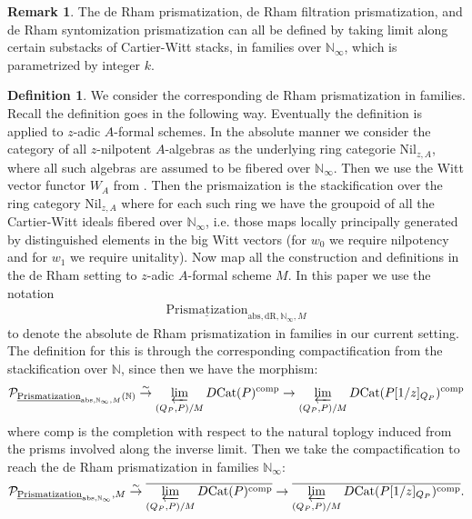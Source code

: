 \documentclass[12pt]{article}
\theoremstyle{definition}
\newtheorem{remark}{Remark}
\newtheorem{definition}{Definition}
\begin{document}
\begin{remark}
The de Rham prismatization, de Rham filtration prismatization, and de Rham syntomization prismatization can all be defined by taking limit along certain substacks of Cartier-Witt stacks, in families over $\mathbb{N}_\infty$, which is parametrized by integer $k$. 
\end{remark}

\begin{definition}
We consider the corresponding de Rham prismatization in families. Recall the definition goes in the following way. Eventually the definition is applied to $z$-adic $A$-formal schemes. In the absolute manner we consider the category of all $z$-nilpotent $A$-algebras as the underlying ring categorie $\mathrm{Nil}_{z,A}$, where all such algebras are assumed to be fibered over $\mathbb{N}_\infty$. Then we use the Witt vector functor $W_A$ from \cite{3LH}. Then the prismaization is the stackification over the ring category $\mathrm{Nil}_{z,A}$ where for each such ring we have the groupoid of all the Cartier-Witt ideals fibered over $\mathbb{N}_\infty$, i.e. those maps locally principally generated by distinguished elements in the big Witt vectors (for $w_0$ we require nilpotency and for $w_1$ we require unitality). Now map all the construction and definitions in the de Rham setting to $z$-adic $A$-formal scheme $M$. In this paper we use the notation 
\begin{align}
\underline{\mathrm{Prismatization}}_{\mathrm{abs},\mathrm{dR},\mathbb{N}_\infty,M}
\end{align}
to denote the absolute de Rham prismatization in families in our current setting. The definition for this is through the corresponding compactification from the stackification over $\mathbb{N}$, since then we have the morphism:
\begin{align}
\mathcal{P}_{\underline{\mathrm{Prismatization}}_{\mathrm{abs},\mathbb{N}_\infty,M}(\mathbb{N})} \overset{\sim}{\rightarrow} \varprojlim_{(Q_P,P)/M} D\mathrm{Cat}(P)^\mathrm{comp}\rightarrow \varprojlim_{(Q_P,P)/M} D\mathrm{Cat}(P[1/z]_{Q_P})^\mathrm{comp}
\end{align}
where $\mathrm{comp}$ is the completion with respect to the natural toplogy induced from the prisms involved along the inverse limit. Then we take the compactification to reach the de Rham prismatization in families $\mathbb{N}_\infty$:
\begin{align}
\mathcal{P}_{\underline{\mathrm{Prismatization}}_{\mathrm{abs},\mathbb{N}_\infty},M} \overset{\sim}{\rightarrow} \overline{\varprojlim_{(Q_P,P)/M} D\mathrm{Cat}(P)^\mathrm{comp}}\rightarrow \overline{\varprojlim_{(Q_P,P)/M} D\mathrm{Cat}(P[1/z]_{Q_P})^\mathrm{comp}}.

\end{align}
\end{definition}
\end{document}
